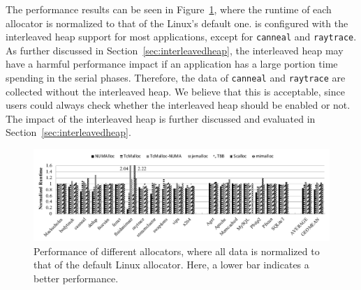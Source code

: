  The performance results can be seen in Figure~\ref{fig:perf}, where the runtime of each allocator is normalized to that of the Linux's default one. \NM{} is configured with the interleaved heap support for most applications, except for \texttt{canneal} and \texttt{raytrace}. As further discussed in Section~\ref{sec:interleavedheap}, the interleaved heap may have a harmful performance impact if an application has a large portion time spending in the serial phases. Therefore, the data of \texttt{canneal} and \texttt{raytrace} are collected without the interleaved heap. We believe that this is acceptable, since users could always check whether the interleaved heap should be enabled or not. The impact of the interleaved heap is further discussed and evaluated in Section~\ref{sec:interleavedheap}. 


\begin{figure}[!ht]
    \centering
   
    \includegraphics[width=5.2in]{figure/8-node-parsec-perf-new.pdf}
    \caption{Performance of different allocators, where all data is normalized to that of the default Linux allocator. Here, a lower bar indicates a better performance.
    \label{fig:perf}}
 \end{figure}


